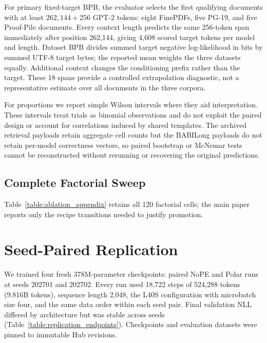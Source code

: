 For primary fixed-target BPB, the evaluator selects the first qualifying documents with at least $262{,}144+256$ GPT-2 tokens: eight FinePDFs, five PG-19, and five Proof-Pile documents. Every context length predicts the same 256-token span immediately after position 262,144, giving 4,608 scored target tokens per model and length. Dataset BPB divides summed target negative log-likelihood in bits by summed UTF-8 target bytes; the reported mean weights the three datasets equally. Additional context changes the conditioning prefix rather than the target. These 18 spans provide a controlled extrapolation diagnostic, not a representative estimate over all documents in the three corpora.

For proportions we report simple Wilson intervals where they aid interpretation. These intervals treat trials as binomial observations and do not exploit the paired design or account for correlations induced by shared templates. The archived retrieval payloads retain aggregate cell counts but the BABILong payloads do not retain per-model correctness vectors, so paired bootstrap or McNemar tests cannot be reconstructed without rerunning or recovering the original predictions.

\begin{landscape}
\section{Complete Factorial Sweep}
\label{appendix:full_ablation}

Table~\ref{table:ablation_appendix} retains all 120 factorial cells; the main paper reports only the recipe transitions needed to justify promotion.
\begingroup
\normalsize
\setlength{\tabcolsep}{5pt}

\endgroup
\end{landscape}

\section{Seed-Paired Replication}
\label{appendix:seed_replication}

We trained four fresh 378M-parameter checkpoints: paired NoPE and Polar runs at seeds 202701 and 202702. Every run used 18,722 steps of 524,288 tokens (9.816B tokens), sequence length 2,048, the L40S configuration with microbatch size four, and the same data order within each seed pair. Final validation NLL differed by architecture but was stable across seeds (Table~\ref{table:replication_endpoints}). Checkpoints and evaluation datasets were pinned to immutable Hub revisions.


